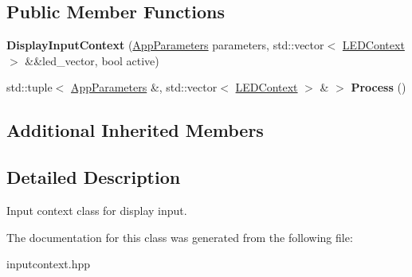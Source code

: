 \subsection*{Public Member Functions}
\begin{DoxyCompactItemize}
\item 
\mbox{\label{classDisplayInputContext_a5f5294995529afa72f09b86423a9cd8b}} 
{\bfseries Display\+Input\+Context} (\hyperlink{structAppParameters}{App\+Parameters} parameters, std\+::vector$<$ \hyperlink{classLEDContext}{L\+E\+D\+Context} $>$ \&\&led\+\_\+vector, bool active)
\item 
\mbox{\label{classDisplayInputContext_a311ae1f786cf44daa1945bd1bd22caa6}} 
std\+::tuple$<$ \hyperlink{structAppParameters}{App\+Parameters} \&, std\+::vector$<$ \hyperlink{classLEDContext}{L\+E\+D\+Context} $>$ \& $>$ {\bfseries Process} ()
\end{DoxyCompactItemize}
\subsection*{Additional Inherited Members}


\subsection{Detailed Description}
Input context class for display input. 

The documentation for this class was generated from the following file\+:\begin{DoxyCompactItemize}
\item 
inputcontext.\+hpp\end{DoxyCompactItemize}
